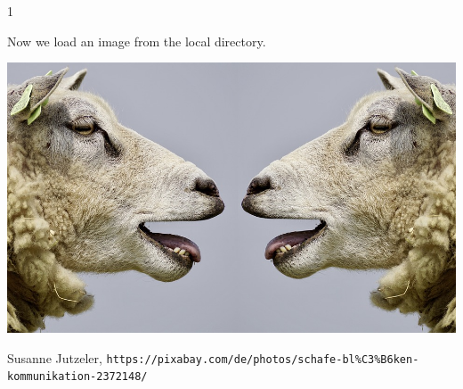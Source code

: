 \documentclass[../main.tex]{subfiles}
\begin{document}
1

Now we load an image from the local directory.
\begin{center}
\includegraphics[width=\textwidth]{sheep-2372148_960_720.jpg}

Susanne Jutzeler, \texttt{https://pixabay.com/de/photos/schafe-bl\%C3\%B6ken-kommunikation-2372148/}
\end{center}




\end{document}

